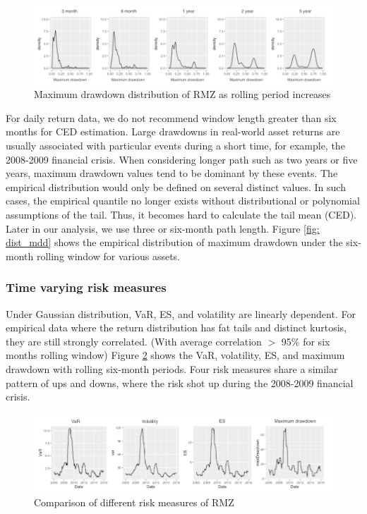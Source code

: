 \documentclass[11pt]{article}
\begin{document}
\begin{figure}[bp]
\centering 
\includegraphics[width = 1\textwidth]{../results/maxdd_RMZ}
\caption{Maximum drawdown distribution of RMZ as rolling period increases} 
\label{fig: dmaxdd_RMZ}
\end{figure}

For daily return data, we do not recommend window length greater than six months for CED estimation. Large drawdowns in real-world asset returns are usually associated with particular events during a short time, for example, the 2008-2009 financial crisis. When considering longer path such as two years or five years, maximum drawdown values tend to be dominant by these events. The empirical distribution would only be defined on several distinct values. In such cases, the empirical quantile no longer exists without distributional or polynomial assumptions of the tail. Thus, it becomes hard to calculate the tail mean (CED). Later in our analysis, we use three or six-month path length. Figure \ref{fig: dist_mdd} shows the empirical distribution of maximum drawdown under the six-month rolling window for various assets.

\subsubsection{Time varying risk measures}

Under Gaussian distribution, VaR, ES, and volatility are linearly dependent. For empirical data where the return distribution has fat tails and distinct kurtosis, they are still strongly correlated. (With average correlation $>$ 95\% for six months rolling window) Figure \ref{fig: risk_meausre_RMZ} shows the VaR, volatility, ES, and maximum drawdown with rolling six-month periods. Four risk measures share a similar pattern of ups and downs, where the risk shot up during the 2008-2009 financial crisis. 

\begin{figure}
\centering 
\includegraphics[width = 1\textwidth]{../results/risk_measure_RMZ}
\caption{Comparison of different risk measures of RMZ} 
\label{fig: risk_meausre_RMZ}
\end{figure}
\end{document}
